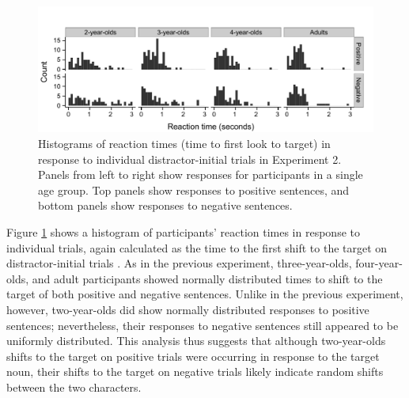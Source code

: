 \documentclass[man]{apa2}
\begin{document}
\begin{figure}
\begin{center} 
\includegraphics[width=6in]{RTs_something.pdf}
\caption{\label{fig:e2rt} Histograms of reaction times (time to first look to target) in response to individual distractor-initial trials in Experiment 2.  Panels from left to right show responses for participants in a single age group.  Top panels show responses to positive sentences, and bottom panels show responses to negative sentences.}
\end{center} 
\end{figure}

Figure \ref{fig:e2rt} shows a histogram of participants' reaction times in response to individual trials, again calculated as the time to the first shift to the target on distractor-initial trials \cite{fernald2008}. As in the previous experiment, three-year-olds, four-year-olds, and adult participants showed normally distributed times to shift to the target of both positive and negative sentences.  Unlike in the previous experiment, however, two-year-olds did show normally distributed responses to positive sentences; nevertheless, their responses to negative sentences still appeared to be uniformly distributed.  This analysis thus suggests that although two-year-olds shifts to the target on positive trials were occurring in response to the target noun, their shifts to the target on negative trials likely indicate random shifts between the two characters.  
\end{document}
